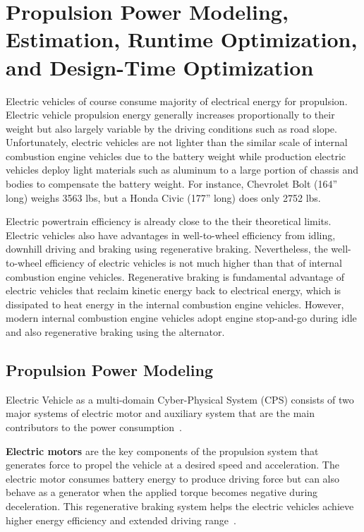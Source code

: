 
\section{Propulsion Power Modeling, Estimation, Runtime Optimization, and Design-Time Optimization} \label{sec:propulsion}

Electric vehicles of course consume majority of electrical energy for propulsion. Electric vehicle propulsion energy generally increases proportionally to their weight but also largely variable by the driving conditions such as road slope. Unfortunately, electric vehicles are not lighter than the similar scale of internal combustion engine vehicles due to the battery weight while production electric vehicles deploy light materials such as aluminum to a large portion of chassis and bodies to compensate the battery weight. For instance, Chevrolet Bolt (164” long) weighs 3563 lbs, but a Honda Civic (177” long) does only 2752 lbs.

Electric powertrain efficiency is already close to the their theoretical limits. Electric vehicles also have advantages in well-to-wheel efficiency from idling, downhill driving and braking using regenerative braking. Nevertheless, the well-to-wheel efficiency of electric vehicles is not much higher than that of internal combustion engine vehicles. Regenerative braking is fundamental advantage of electric vehicles that reclaim kinetic energy back to electrical energy, which is dissipated to heat energy in the internal combustion engine vehicles. However, modern internal combustion engine vehicles adopt engine stop-and-go during idle and also regenerative braking using the alternator.

\subsection{Propulsion Power Modeling} \label{subsec:propulsion_model}

Electric Vehicle as a multi-domain Cyber-Physical System (CPS) consists of two major systems of electric motor and auxiliary system that are the main contributors to the power consumption~\cite{AF_1,AF_2,AF_3,Park:DAC13}.

\textbf{Electric motors} are the key components of the propulsion system that generates force to propel the vehicle at a desired speed and acceleration. The electric motor consumes battery energy to produce driving force but can also behave as a generator when the applied torque becomes negative during deceleration. This regenerative braking system helps the electric vehicles achieve higher energy efficiency and extended driving range~\cite{AF_5,AF_6,AF_7}.


